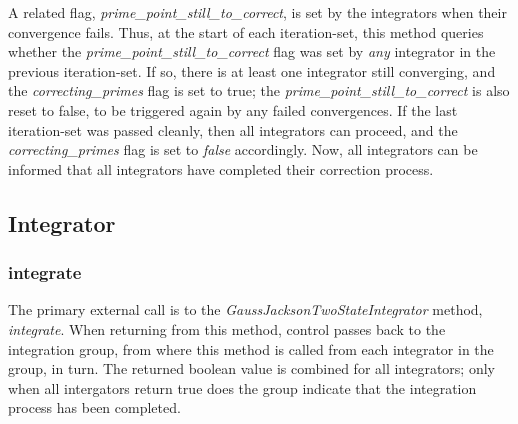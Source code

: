 A related flag, \textit{prime\_point\_still\_to\_correct}, is set by the
integrators when their convergence fails.  Thus, at the start of each
iteration-set, this method queries whether the 
\textit{prime\_point\_still\_to\_correct} flag was set by \textit{any}
integrator in the previous iteration-set.  If so, there is at least one 
integrator still converging, and the \textit{correcting\_primes} flag is set
to true; the \textit{prime\_point\_still\_to\_correct} is also reset to false,
to be triggered again by any failed convergences.  If the last iteration-set 
was passed cleanly, then all integrators can proceed, and the 
\textit{correcting\_primes}
flag is set to \textit{false} accordingly.  Now, all integrators can be 
informed that all integrators have completed their correction process. 


\subsection{Integrator}\label{sec:GJ_Detailed_Design_Integrator}

\subsubsection{integrate}\label{ref:GJ_integrate}
The primary external call is to the
\textit{GaussJacksonTwoStateIntegrator} method, \textit{integrate}.  When returning from this method, control passes back to the integration group, from where this method is called from each integrator in the group, in turn.  The returned boolean value is combined for all integrators; only when all intergators return true does the group indicate that the integration process has been completed.

